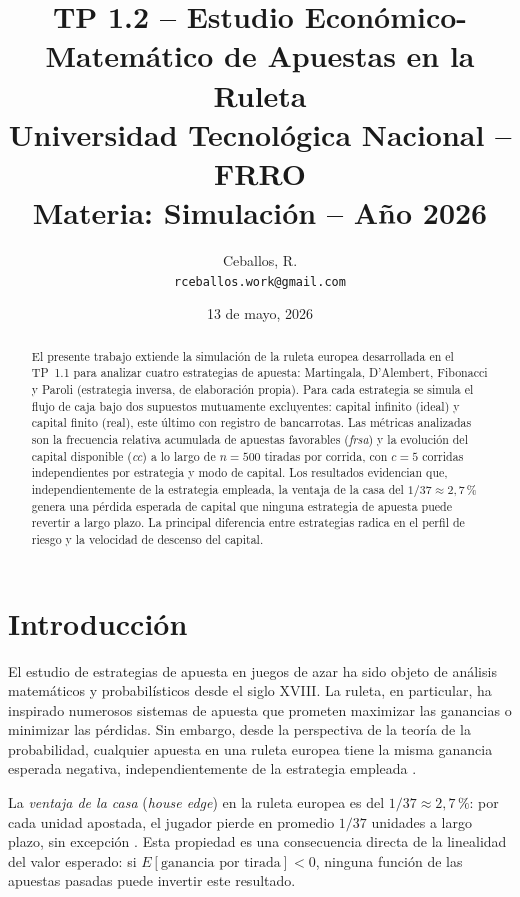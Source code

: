 \documentclass[a4paper, 11pt]{article}
\title{%
  \textbf{TP 1.2 -- Estudio Económico-Matemático de Apuestas en la Ruleta} \\[6pt]
  \large Universidad Tecnológica Nacional -- FRRO \\
  \large Materia: Simulación -- Año 2026
}
\author{
  Ceballos, R. \\
  \texttt{rceballos.work@gmail.com}
}
\date{13 de mayo, 2026}
\begin{document}
\maketitle

\begin{abstract}
El presente trabajo extiende la simulación de la ruleta europea desarrollada
en el TP~1.1 para analizar cuatro estrategias de apuesta: Martingala,
D'Alembert, Fibonacci y Paroli (estrategia inversa, de elaboración propia).
Para cada estrategia se simula el flujo de caja bajo dos supuestos mutuamente
excluyentes: capital infinito (ideal) y capital finito (real), este último
con registro de bancarrotas. Las métricas analizadas son la frecuencia relativa
acumulada de apuestas favorables (\textit{frsa}) y la evolución del capital
disponible (\textit{cc}) a lo largo de $n = 500$ tiradas por corrida, con
$c = 5$ corridas independientes por estrategia y modo de capital.
Los resultados evidencian que, independientemente de la estrategia empleada,
la ventaja de la casa del $1/37 \approx 2{,}7\,\%$ genera una pérdida
esperada de capital que ninguna estrategia de apuesta puede revertir a
largo plazo. La principal diferencia entre estrategias radica en el perfil
de riesgo y la velocidad de descenso del capital.
\end{abstract}

\section{Introducción}

El estudio de estrategias de apuesta en juegos de azar ha sido objeto de
análisis matemáticos y probabilísticos desde el siglo XVIII. La ruleta,
en particular, ha inspirado numerosos sistemas de apuesta que prometen
maximizar las ganancias o minimizar las pérdidas. Sin embargo, desde la
perspectiva de la teoría de la probabilidad, cualquier apuesta en una
ruleta europea tiene la misma ganancia esperada negativa, independientemente
de la estrategia empleada \cite{ross2014introduction}.

La \textit{ventaja de la casa} (\textit{house edge}) en la ruleta europea
es del $1/37 \approx 2{,}7\,\%$: por cada unidad apostada, el jugador
pierde en promedio $1/37$ unidades a largo plazo, sin excepción
\cite{wikipedia_ruleta}. Esta propiedad es una consecuencia directa de la
linealidad del valor esperado: si $E[\text{ganancia por tirada}] < 0$,
ninguna función de las apuestas pasadas puede invertir este resultado.
\end{document}

